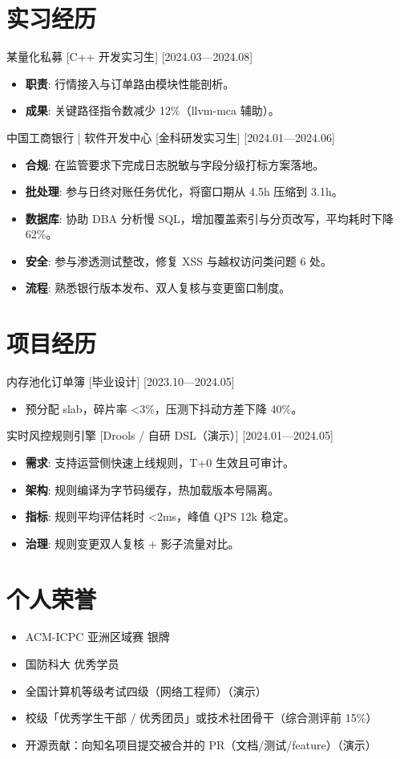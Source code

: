 \documentclass{resume-photo}
\begin{document}
\section{实习经历}
\ResumeItem
{某量化私募}
[\textnormal{C++ 开发实习生}]
[2024.03—2024.08]

\begin{itemize}
  \item \textbf{职责}: 行情接入与订单路由模块性能剖析。
  \item \textbf{成果}: 关键路径指令数减少 12\%（llvm-mca 辅助）。
\end{itemize}


\ResumeItem
{中国工商银行 | 软件开发中心}
[\textnormal{金科研发实习生}]
[2024.01—2024.06]

\begin{itemize}
  \item \textbf{合规}: 在监管要求下完成日志脱敏与字段分级打标方案落地。
  \item \textbf{批处理}: 参与日终对账任务优化，将窗口期从 4.5h 压缩到 3.1h。
  \item \textbf{数据库}: 协助 DBA 分析慢 SQL，增加覆盖索引与分页改写，平均耗时下降 62\%。
  \item \textbf{安全}: 参与渗透测试整改，修复 XSS 与越权访问类问题 6 处。
  \item \textbf{流程}: 熟悉银行版本发布、双人复核与变更窗口制度。
\end{itemize}



\section{项目经历}
\ResumeItem
{内存池化订单簿}
[\textnormal{毕业设计}]
[2023.10—2024.05]

\begin{itemize}
  \item 预分配 slab，碎片率 <3\%，压测下抖动方差下降 40\%。
\end{itemize}


\ResumeItem
{实时风控规则引擎}
[\textnormal{Drools / 自研 DSL（演示）}]
[2024.01—2024.05]

\begin{itemize}
  \item \textbf{需求}: 支持运营侧快速上线规则，T+0 生效且可审计。
  \item \textbf{架构}: 规则编译为字节码缓存，热加载版本号隔离。
  \item \textbf{指标}: 规则平均评估耗时 <2ms，峰值 QPS 12k 稳定。
  \item \textbf{治理}: 规则变更双人复核 + 影子流量对比。
\end{itemize}



\section{个人荣誉}
\begin{itemize}
  \item ACM-ICPC 亚洲区域赛 银牌
  \item 国防科大 优秀学员
  \item 全国计算机等级考试四级（网络工程师）（演示）
  \item 校级「优秀学生干部 / 优秀团员」或技术社团骨干（综合测评前 15\%）
  \item 开源贡献：向知名项目提交被合并的 PR（文档/测试/feature）（演示）
\end{itemize}
\end{document}
